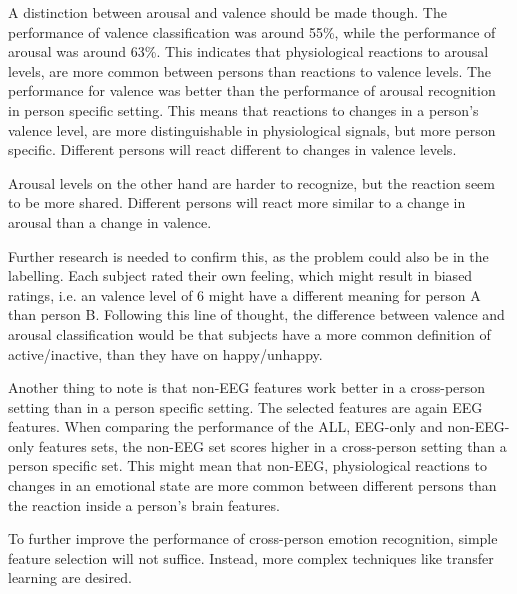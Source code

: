 \npar 

A distinction between arousal and valence should be made though. The performance of valence classification was around 55\%, while the performance of arousal was around 63\%. This indicates that physiological reactions to arousal levels, are more common between persons than reactions to valence levels. The performance for valence was better than the performance of arousal recognition in person specific setting. This means that reactions to changes in a person's valence level, are more distinguishable in physiological signals, but more person specific. Different persons will react different to changes in valence levels.

\npar

Arousal levels on the other hand are harder to recognize, but the reaction seem to be more shared. Different persons will react more similar to a change in arousal than a change in valence.

\npar

Further research is needed to confirm this, as the problem could also be in the labelling. Each subject rated their own feeling, which might result in biased ratings, i.e. an valence level of 6 might have a different meaning for person A than person B. Following this line of thought, the difference between valence and arousal classification would be that subjects have a more common definition of active/inactive, than they have on happy/unhappy.

\npar

Another thing to note is that non-EEG features work better in a cross-person setting than in a person specific setting. The selected features are again EEG features. When comparing the performance of the ALL, EEG-only and non-EEG-only features sets, the non-EEG set scores higher in a cross-person setting than a person specific set. This might mean that non-EEG, physiological reactions to changes in an emotional state are more common between different persons than the reaction inside a person's brain features.

\npar

To further improve the performance of cross-person emotion recognition, simple feature selection will not suffice. Instead, more complex techniques like transfer learning are desired. 